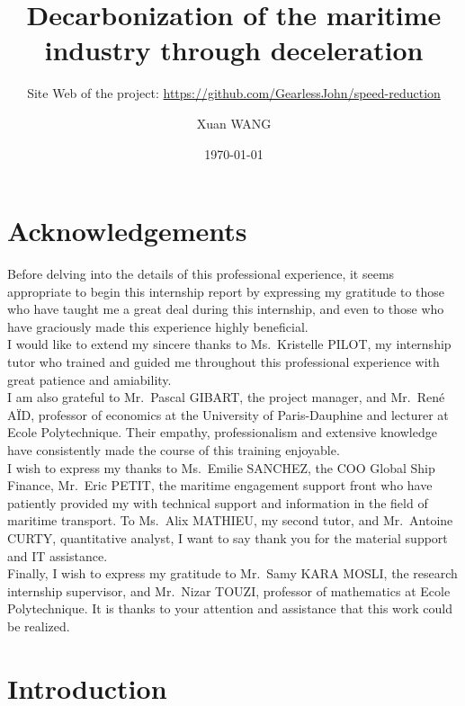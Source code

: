 \documentclass[a4paper,12pt]{article}
\author{Xuan WANG}
\date{\today}
\title{Decarbonization of the maritime industry through deceleration}
\subtitle{Site Web of the project: \url{https://github.com/GearlessJohn/speed-reduction}}%
\begin{document}
\maketitle

\newpage
\thispagestyle{empty}
\section*{Acknowledgements}

Before delving into the details of this professional experience, it seems appropriate to begin this internship report by expressing my gratitude to those who have taught me a great deal during this internship, and even to those who have graciously made this experience highly beneficial.\\

I would like to extend my sincere thanks to Ms.~Kristelle PILOT, my internship tutor who trained and guided me throughout this professional experience with great patience and amiability.\\

I am also grateful to Mr.~Pascal GIBART, the project manager, and Mr.~René AÏD, professor of economics at the University of Paris-Dauphine and lecturer at Ecole Polytechnique.
Their empathy, professionalism and extensive knowledge have consistently made the course of this training enjoyable.\\

I wish to express my thanks to Ms.~Emilie SANCHEZ, the COO Global Ship Finance, Mr.~Eric PETIT, the maritime engagement support front who have patiently provided my with technical support and information in the field of maritime transport.
To Ms.~Alix MATHIEU, my second tutor, and Mr.~Antoine CURTY, quantitative analyst, I want to say thank you for the material support and IT assistance.\\

Finally, I wish to express my gratitude to Mr.~Samy KARA MOSLI, the research internship supervisor, and Mr.~Nizar TOUZI, professor of mathematics at Ecole Polytechnique.
It is thanks to your attention and assistance that this work could be realized.




\newpage
\thispagestyle{empty}
\tableofcontents


\renewcommand{\thepage}{\arabic{page}}

\newpage
\setcounter{page}{1}
\section{Introduction}
\end{document}
